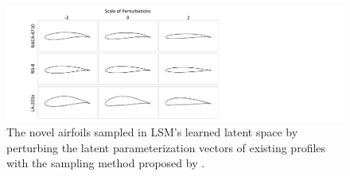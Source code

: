 \begin{figure}[!tb]
    \begin{center}
        \includegraphics[width=0.75\linewidth]{chapter4/fig/lsm_sample.pdf}
    \end{center}
    \caption{
        \small The novel airfoils sampled in LSM's learned latent space by perturbing the latent parameterization vectors of existing profiles with the sampling method proposed by \citet{ai.Shen2021b}.
    }
    \label{ch4:fig:lsm_sample}
\end{figure}
